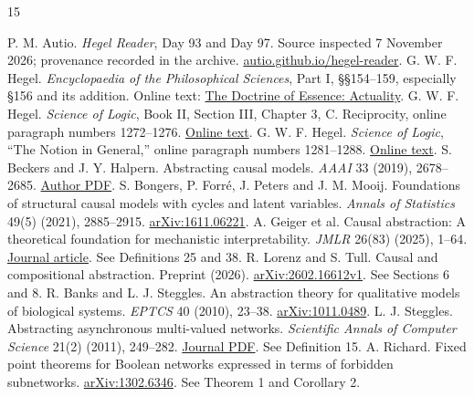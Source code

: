 \documentclass[11pt,a4paper]{article}
\theoremstyle{definition}
\theoremstyle{remark}
\begin{document}
\begin{thebibliography}{15}\small\raggedright\setlength{\itemsep}{1pt}
 P. M. Autio. \emph{Hegel Reader}, Day 93 and Day 97. Source inspected 7 November 2026; provenance recorded in the archive. \href{https://autio.github.io/hegel-reader/}{autio.github.io/hegel-reader}.
 G. W. F. Hegel. \emph{Encyclopaedia of the Philosophical Sciences}, Part I, \S\S154--159, especially \S156 and its addition. Online text: \href{https://www.marxists.org/reference/archive/hegel/works/sl/slactual.htm}{The Doctrine of Essence: Actuality}.
 G. W. F. Hegel. \emph{Science of Logic}, Book II, Section III, Chapter 3, C. Reciprocity, online paragraph numbers 1272--1276. \href{https://www.marxists.org/reference/archive/hegel/works/hl/hlessenc.htm}{Online text}.
 G. W. F. Hegel. \emph{Science of Logic}, ``The Notion in General,'' online paragraph numbers 1281--1288. \href{https://www.marxists.org/reference/archive/hegel/works/hl/hlnotion.htm}{Online text}.
 S. Beckers and J. Y. Halpern. Abstracting causal models. \emph{AAAI} 33 (2019), 2678--2685. \href{https://www.cs.cornell.edu/home/halpern/papers/abstraction.pdf}{Author PDF}.
 S. Bongers, P. Forr\'e, J. Peters and J. M. Mooij. Foundations of structural causal models with cycles and latent variables. \emph{Annals of Statistics} 49(5) (2021), 2885--2915. \href{https://arxiv.org/abs/1611.06221}{arXiv:1611.06221}.
 A. Geiger et al. Causal abstraction: A theoretical foundation for mechanistic interpretability. \emph{JMLR} 26(83) (2025), 1--64. \href{https://jmlr.org/papers/v26/23-0058.html}{Journal article}. See Definitions 25 and 38.
 R. Lorenz and S. Tull. Causal and compositional abstraction. Preprint (2026). \href{https://arxiv.org/abs/2602.16612}{arXiv:2602.16612v1}. See Sections 6 and 8.
 R. Banks and L. J. Steggles. An abstraction theory for qualitative models of biological systems. \emph{EPTCS} 40 (2010), 23--38. \href{https://arxiv.org/abs/1011.0489}{arXiv:1011.0489}.
 L. J. Steggles. Abstracting asynchronous multi-valued networks. \emph{Scientific Annals of Computer Science} 21(2) (2011), 249--282. \href{https://publications.info.uaic.ro/files/sacs/XXI2/XXI2_3.pdf}{Journal PDF}. See Definition 15.
 A. Richard. Fixed point theorems for Boolean networks expressed in terms of forbidden subnetworks. \href{https://arxiv.org/abs/1302.6346}{arXiv:1302.6346}. See Theorem 1 and Corollary 2.

\end{thebibliography}
\end{document}
